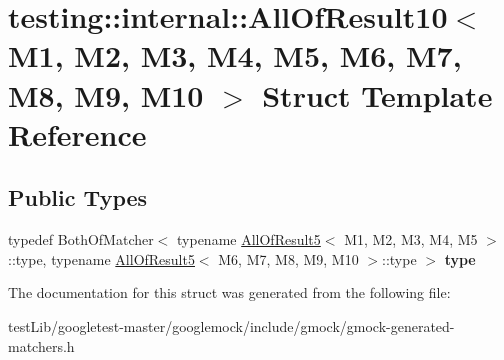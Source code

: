 \hypertarget{structtesting_1_1internal_1_1AllOfResult10}{}\section{testing\+:\+:internal\+:\+:All\+Of\+Result10$<$ M1, M2, M3, M4, M5, M6, M7, M8, M9, M10 $>$ Struct Template Reference}
\label{structtesting_1_1internal_1_1AllOfResult10}
\subsection*{Public Types}
\begin{DoxyCompactItemize}
\item 
\mbox{\label{structtesting_1_1internal_1_1AllOfResult10_a48d6c6de6d0d5445b212119e1f536af5}} 
typedef Both\+Of\+Matcher$<$ typename \hyperlink{structtesting_1_1internal_1_1AllOfResult5}{All\+Of\+Result5}$<$ M1, M2, M3, M4, M5 $>$\+::type, typename \hyperlink{structtesting_1_1internal_1_1AllOfResult5}{All\+Of\+Result5}$<$ M6, M7, M8, M9, M10 $>$\+::type $>$ {\bfseries type}
\end{DoxyCompactItemize}


The documentation for this struct was generated from the following file\+:\begin{DoxyCompactItemize}
\item 
test\+Lib/googletest-\/master/googlemock/include/gmock/gmock-\/generated-\/matchers.\+h\end{DoxyCompactItemize}
